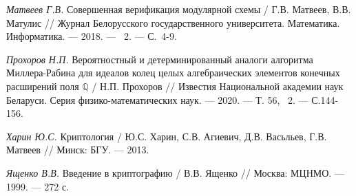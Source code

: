 \begin{thebibliography}{99}
    \textit{Матвеев Г.В.} Совершенная верификация модулярной схемы / Г.В. Матвеев, В.В. Матулис // Журнал Белорусского государственного университета. Математика. Информатика. --- 2018. --- \textnumero~2. --- С.~4-9.

    \textit{Прохоров Н.П.} Вероятностный и детерминированный аналоги алгоритма Миллера-Рабина для идеалов колец целых алгебраических элементов конечных расширений поля $\mathbb{Q}$ / Н.П. Прохоров // Известия Национальной академии наук Беларуси. Серия физико-математических наук. --- 2020. --- Т. 56, \textnumero~2. --- С.144-156.
    
    \textit{Харин Ю.С.} Криптология / Ю.С. Харин, С.В. Агиевич, Д.В. Васьльев, Г.В. Матвеев // Минск: БГУ. --- 2013.

    \textit{Ященко В.В.} Введение в криптографию / В.В. Ященко // Москва: МЦНМО. --- 1999. --- 272 с.

\end{thebibliography}








